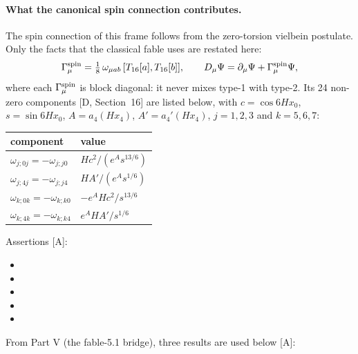 \paragraph{What the canonical spin connection contributes.} The spin connection of this frame
follows from the zero-torsion vielbein postulate. Only the facts that the classical fable uses
are restated here:
\begin{equation}
  \Gamma^{\rm spin}_\mu=\tfrac18\,\omega_{\mu ab}\,[T_{16}[a],T_{16}[b]],\qquad
  D_\mu\Psi=\partial_\mu\Psi+\Gamma^{\rm spin}_\mu\Psi ,
\end{equation}
where each $\Gamma^{\rm spin}_\mu$ is block diagonal: it never mixes type-1 with type-2.
Its 24 non-zero components [D, Section~16] are listed below, with $c=\cos 6Hx_0$,
$s=\sin 6Hx_0$, $A=a_4(Hx_4)$, $A'=a_4'(Hx_4)$, $j=1,2,3$ and $k=5,6,7$:
\begin{center}
\begin{tabular}{@{}ll@{}}
\toprule
component & value\\
\midrule
$\omega_{j;0j}=-\omega_{j;j0}$ & $H c^2/(e^{A}s^{13/6})$\\
$\omega_{j;4j}=-\omega_{j;j4}$ & $H A'/(e^{A}s^{1/6})$\\
$\omega_{k;0k}=-\omega_{k;k0}$ & $-e^{A}H c^2/s^{13/6}$\\
$\omega_{k;4k}=-\omega_{k;k4}$ & $e^{A}H A'/s^{1/6}$\\
\bottomrule
\end{tabular}
\end{center}
Assertions [A]:
\begin{itemize}
  \item {}
  \item {}
  \item {}
  \item {}
  \item {}
\end{itemize}
From Part V (the fable-5.1 bridge), three results are used below [A]:

